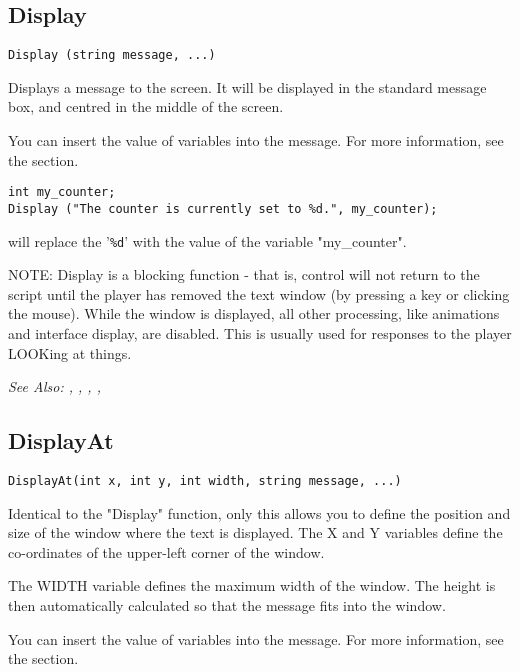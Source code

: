 \subsection{Display}\label{Display}%

\begin{verbatim}
Display (string message, ...)
\end{verbatim}
Displays a message to the screen. It will be displayed in the standard
message box, and centred in the middle of the screen.

You can insert the value of variables into the message. For more information,
see the  section.

\begin{verbatim}
int my_counter;
Display ("The counter is currently set to %d.", my_counter);
\end{verbatim}
will replace the '\verb$%d$' with the value of the variable "my_counter".

NOTE: Display is a blocking function - that is, control will not return
to the script until the player has removed the text window (by pressing a
key or clicking the mouse). While the window is displayed, all other
processing, like animations and interface display, are disabled. This is
usually used for responses to the player LOOKing at things.

\it{See Also:} , ,
, ,


\subsection{DisplayAt}\label{DisplayAt}%

\begin{verbatim}
DisplayAt(int x, int y, int width, string message, ...)

\end{verbatim}
Identical to the "Display" function, only this allows you to define the
position and size of the window where the text is displayed. The X and Y
variables define the co-ordinates of the upper-left corner of the window.

The WIDTH variable defines the maximum width of the window. The height is then
automatically calculated so that the message fits into the window.

You can insert the value of variables into the message. For more information,
see the  section.

